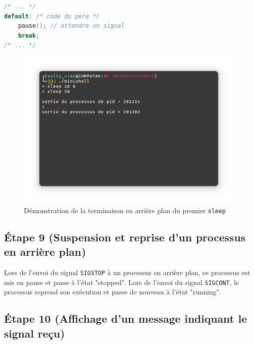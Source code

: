 \documentclass{article}
\begin{document}
\begin{lstlisting}[language=C, caption=ajout de la question 8]
/* ... */
default: /* code du pere */
    pause(); // attendre un signal
    break;
/* ... */
\end{lstlisting}

\begin{figure}[H]
    \centering
    \includegraphics[width=\textwidth]{./resources/E8.png}
    \caption{Démonstration de la terminaison en arrière plan du premier \texttt{sleep}}
\end{figure}

\subsection*{Étape 9 (Suspension et reprise d'un processus en arrière plan)}

Lors de l'envoi du signal \texttt{SIGSTOP} à un processus en arrière plan, ce processus est mis en pause et passe à l'état "stopped". Lors de l'envoi du signal \texttt{SIGCONT}, le processus reprend son exécution et passe de nouveau à l'état "running".

\subsection*{Étape 10 (Affichage d'un message indiquant le signal reçu)}
\end{document}
